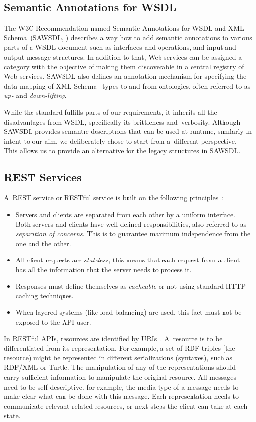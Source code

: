 \documentclass[smallextended]{svjour3}
\begin{document}
\subsection{Semantic Annotations for WSDL}
The W3C Recommendation named Semantic Annotations for WSDL and XML Schema~(SAWSDL, \cite{SAWSDL}) describes a way how to add semantic annotations to various parts of a WSDL document such as interfaces and operations, and input and output message structures. In addition to that, Web services can be assigned a category with the objective of making them discoverable in a central registry of Web services. SAWSDL also defines an annotation mechanism for specifying the data mapping of XML Schema~\cite{xmlschema11-1,xmlschema11-2} types to and from ontologies, often referred to as \emph{up-} and \emph{down-lifting}.

While the standard fulfills parts of our requirements, it inherits all the disadvantages from WSDL, specifically its brittleness and~verbosity.
Although SAWSDL provides semantic descriptions that can be used at runtime, similarly in intent to our aim, we deliberately chose to start from a~different perspective.
This allows us to provide an alternative for the legacy structures in SAWSDL.

\subsection{REST Services}

A~REST service or RESTful service is built on the following principles~\cite{FieldingREST}:
\begin{itemize}
\item Servers and clients are separated from each other by a uniform interface. Both servers and clients have well-defined responsibilities, also referred to as \emph{separation of concerns}. This is to guarantee maximum independence from the one and the other.
\item All client requests are \emph{stateless}, this means that each request from a client has all the information that the server needs to process it.
\item Responses must define themselves as \emph{cacheable} or not using standard HTTP caching techniques.
\item When layered systems (like load-balancing) are used, this fact must not be exposed to the API user.
\end{itemize}

In RESTful APIs, resources are identified by URIs~\cite{Gonzalez}. A~resource is to be differentiated from its representation. For example, a set of RDF triples (the resource) might be represented in different serializations (syntaxes), such as RDF/XML or Turtle.
The manipulation of any of the representations should carry sufficient information to manipulate the original resource.
All messages need to be self-descriptive, for example, the media type of a message needs to make clear what can be done with this message. Each representation needs to communicate relevant related resources, or next steps the client can take at each state.
\end{document}
